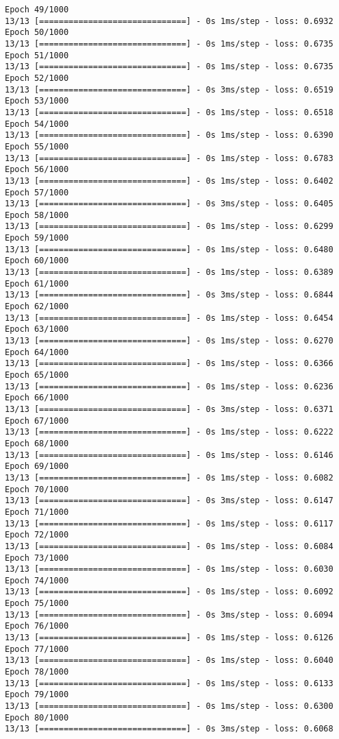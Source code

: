 \documentclass[11pt]{article}
\begin{document}
\begin{Verbatim}[commandchars=\\\{\}]
Epoch 49/1000
13/13 [==============================] - 0s 1ms/step - loss: 0.6932
Epoch 50/1000
13/13 [==============================] - 0s 1ms/step - loss: 0.6735
Epoch 51/1000
13/13 [==============================] - 0s 1ms/step - loss: 0.6735
Epoch 52/1000
13/13 [==============================] - 0s 3ms/step - loss: 0.6519
Epoch 53/1000
13/13 [==============================] - 0s 1ms/step - loss: 0.6518
Epoch 54/1000
13/13 [==============================] - 0s 1ms/step - loss: 0.6390
Epoch 55/1000
13/13 [==============================] - 0s 1ms/step - loss: 0.6783
Epoch 56/1000
13/13 [==============================] - 0s 1ms/step - loss: 0.6402
Epoch 57/1000
13/13 [==============================] - 0s 3ms/step - loss: 0.6405
Epoch 58/1000
13/13 [==============================] - 0s 1ms/step - loss: 0.6299
Epoch 59/1000
13/13 [==============================] - 0s 1ms/step - loss: 0.6480
Epoch 60/1000
13/13 [==============================] - 0s 1ms/step - loss: 0.6389
Epoch 61/1000
13/13 [==============================] - 0s 3ms/step - loss: 0.6844
Epoch 62/1000
13/13 [==============================] - 0s 1ms/step - loss: 0.6454
Epoch 63/1000
13/13 [==============================] - 0s 1ms/step - loss: 0.6270
Epoch 64/1000
13/13 [==============================] - 0s 1ms/step - loss: 0.6366
Epoch 65/1000
13/13 [==============================] - 0s 1ms/step - loss: 0.6236
Epoch 66/1000
13/13 [==============================] - 0s 3ms/step - loss: 0.6371
Epoch 67/1000
13/13 [==============================] - 0s 1ms/step - loss: 0.6222
Epoch 68/1000
13/13 [==============================] - 0s 1ms/step - loss: 0.6146
Epoch 69/1000
13/13 [==============================] - 0s 1ms/step - loss: 0.6082
Epoch 70/1000
13/13 [==============================] - 0s 3ms/step - loss: 0.6147
Epoch 71/1000
13/13 [==============================] - 0s 1ms/step - loss: 0.6117
Epoch 72/1000
13/13 [==============================] - 0s 1ms/step - loss: 0.6084
Epoch 73/1000
13/13 [==============================] - 0s 1ms/step - loss: 0.6030
Epoch 74/1000
13/13 [==============================] - 0s 1ms/step - loss: 0.6092
Epoch 75/1000
13/13 [==============================] - 0s 3ms/step - loss: 0.6094
Epoch 76/1000
13/13 [==============================] - 0s 1ms/step - loss: 0.6126
Epoch 77/1000
13/13 [==============================] - 0s 1ms/step - loss: 0.6040
Epoch 78/1000
13/13 [==============================] - 0s 1ms/step - loss: 0.6133
Epoch 79/1000
13/13 [==============================] - 0s 1ms/step - loss: 0.6300
Epoch 80/1000
13/13 [==============================] - 0s 3ms/step - loss: 0.6068

\end{Verbatim}
\end{document}
